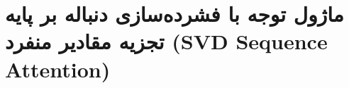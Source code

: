 \section{ماژول توجه با فشرده‌سازی دنباله بر پایه تجزیه مقادیر منفرد (SVD Sequence Attention)}
\label{sec:module_svd_attention}
